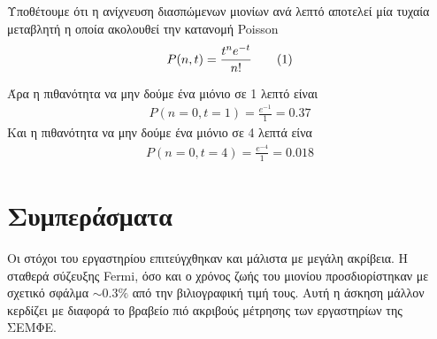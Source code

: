 \documentclass[a4paper]{book}
\newcommand\numberthis{\addtocounter{equation}{1}\tag{\theequation}}
\begin{document}
	Υποθέτουμε ότι η ανίχνευση διασπώμενων μιονίων ανά λεπτό αποτελεί μία τυχαία μεταβλητή η οποία ακολουθεί την κατανομή Poisson 
	\begin{align*}%
		P(n,t) = \frac{t^n e^{-t}}{n!}\numberthis
	\end{align*}

Άρα η πιθανότητα να μην δούμε ένα μιόνιο σε 1 λεπτό είναι 
	\begin{align*}%
		P(n=0,t=1) = \frac{e^{-1} }{1} = 0.37 
	\end{align*}
Και η πιθανότητα να μην δούμε ένα μιόνιο σε 4 λεπτά είνα 
	\begin{align*}%
		P(n=0,t=4) = \frac{e^{-4}}{1} = 0.018
	\end{align*}
	
	
	
	
\section*{Συμπεράσματα}
	Οι στόχοι του εργαστηρίου επιτεύγχθηκαν και μάλιστα με μεγάλη ακρίβεια. Η σταθερά σύζευξης Fermi, όσο και ο χρόνος ζωής του μιονίου προσδιορίστηκαν με σχετικό σφάλμα $\sim0.3\%$ από την βιλιογραφική τιμή τους. Αυτή η άσκηση μάλλον κερδίζει με διαφορά το βραβείο πιό ακριβούς μέτρησης των εργαστηρίων της ΣΕΜΦΕ. 
\end{document}
